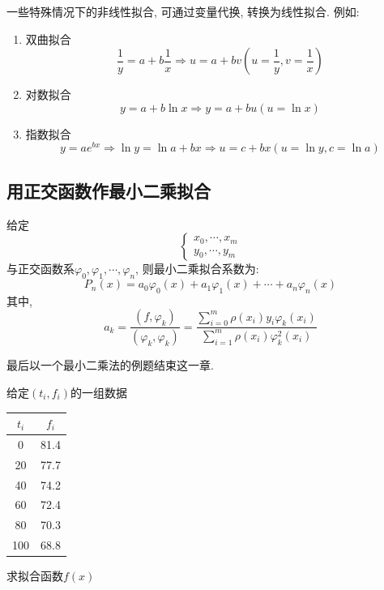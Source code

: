 一些特殊情况下的非线性拟合, 可通过变量代换, 转换为线性拟合. 例如:
\begin{enumerate}
    \item 双曲拟合
    \begin{equation*}
        \frac{1}{y}=a+b\frac{1}{x}\Rightarrow u=a+bv(u=\frac{1}{y},v=\frac{1}{x})
    \end{equation*}
    \item 对数拟合
    \begin{equation*}
        y=a+b\ln{x}\Rightarrow y=a+bu(u=\ln{x})
    \end{equation*}
    \item 指数拟合
    \begin{equation*}
        y=ae^{bx}\Rightarrow\ln{y}=\ln{a}+bx\Rightarrow u=c+bx(u=\ln{y},c=\ln{a})
    \end{equation*}
\end{enumerate}

\subsection{用正交函数作最小二乘拟合}

给定
\begin{equation*}
    \begin{cases}
        x_0,\cdots,x_m\\
        y_0,\cdots,y_m
    \end{cases}
\end{equation*}
与正交函数系$\varphi_0,\varphi_1,\cdots,\varphi_n$, 则最小二乘拟合系数为:
\begin{equation*}
    P_n(x)=a_0\varphi_0(x)+a_1\varphi_1(x)+\cdots+a_n\varphi_n(x)
\end{equation*}
其中,
\begin{equation*}
    a_k=\frac{(f,\varphi_k)}{(\varphi_k,\varphi_k)}=\frac{\sum_{i=0}^m\rho(x_i)y_i\varphi_k(x_i)}{\sum_{i=1}^m\rho(x_i)\varphi_k^2(x_i)}
\end{equation*}

最后以一个最小二乘法的例题结束这一章.

\begin{example}
    给定$(t_i,f_i)$的一组数据

    \begin{tabular}{|c|c|}
        \hline
        $t_i$&$f_i$\\
        \hline
        0&81.4\\
        20&77.7\\
        40&74.2\\
        60&72.4\\
        80&70.3\\
        100&68.8\\
        \hline
    \end{tabular}

    求拟合函数$f(x)$
\end{example}

